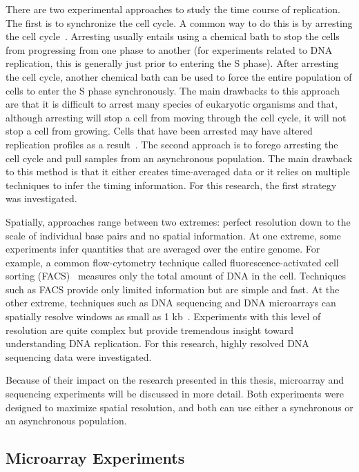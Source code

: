 	There are two experimental approaches to study the time course of replication.
	The first is to synchronize the cell cycle.
	A common way to do this is by arresting the cell cycle~\cite{CellCycleSynch}.
	Arresting usually entails using a chemical bath to stop the cells from progressing from one phase to another (for experiments related to DNA replication, this is generally just prior to entering the S phase).
	After arresting the cell cycle, another chemical bath can be used to force the entire population of cells to enter the S phase synchronously.
	The main drawbacks to this approach are that  it is difficult to arrest many species of eukaryotic organisms and that, although arresting will stop a cell from moving through the cell cycle, it will not stop a cell from growing.
	Cells that have been arrested may have altered replication profiles as a result~\cite{CellCycleSynch}.
	The second approach is to forego arresting the cell cycle and pull samples from an asynchronous population.
	The main drawback to this method is that it either creates time-averaged data or it relies on multiple techniques to infer the timing information.
	For this research, the first strategy was investigated.
	
	Spatially, approaches range between two extremes: perfect resolution down to the scale of individual base pairs and no spatial information.
	At one extreme, some experiments infer quantities that are averaged over the entire genome. 
	For example, a common flow-cytometry technique called fluorescence-activated cell sorting (FACS)~\cite{DeepSeq, SequencingReview} measures only the total amount of DNA in the cell.
	Techniques such as FACS provide only limited information but are simple and fast.
	At the other extreme, techniques such as DNA sequencing and DNA microarrays can spatially resolve windows as small as 1 kb~\cite{DeepSeq}.
	Experiments with this level of resolution are quite complex but provide tremendous insight toward understanding DNA replication.
	For this research, highly resolved DNA sequencing data were investigated.
	
	Because of their impact on the research presented in this thesis, microarray and sequencing experiments will be discussed in more detail.
	Both experiments were designed to maximize spatial resolution, and both can use either a synchronous or an asynchronous population.
	
	
		\subsection{Microarray Experiments}
		\label{subsec:Microarray}
		
